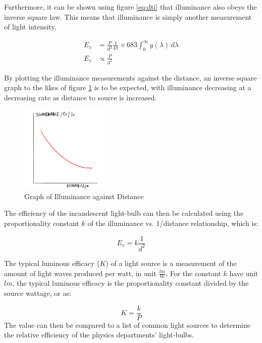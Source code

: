 \documentclass[a4paper,12pt]{article}
\begin{document}
Furthermore, it can be shown using figure \ref{eq:dti} that illuminance also obeys the inverse square law. This means that illuminance is simply another measurement of light intensity.

\begin{align*}
 E_v &=  \frac{P}{d^2} \frac{1}{4\pi} \times 683 \int_{0}^{\infty} y(\lambda) \, d\lambda\\
 E_v &\propto \frac{P}{d^2}
\end{align*}

By plotting the illuminance measurements against the distance, an inverse square graph to the likes of figure \ref{fig:relation} is to be expected, with illuminance decreasing at a decreasing rate as distance to source is increased.

\begin{figure}[H]
    \centering
    \includegraphics[width=0.37\textwidth]{assets/relationship.png}
    \caption{Graph of Illuminance against Distance}
    \label{fig:relation}
\end{figure}

The efficiency of the incandescent light-bulb can then be calculated using the proportionality constant $k$ of the illuminance vs. 1/distance relationship, which is:

\[
E_v = k \frac{1}{d^2}
\]

The typical luminous efficacy ($K$) of a light source is a measurement of the amount of light waves produced per watt, in unit $\frac{\si{lm}}{W}$. For the constant $k$ have unit $\si{lm}$, the typical luminous efficacy is the proportionality constant divided by the source wattage, or as:

\[
K = \frac{k}{P}
\]
The value can then be compared to a list of common light sources to determine the relative efficiency of the physics departments' light-bulbs.

\end{document}
